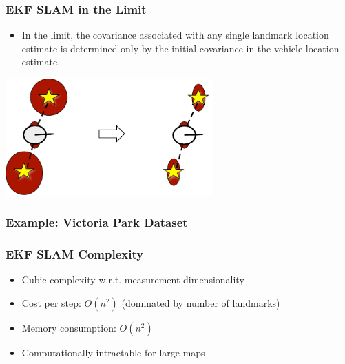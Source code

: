 \begin{frame}
    \frametitle{EKF SLAM in the Limit}
    
    \begin{itemize}
        \item In the limit, the covariance associated with any single landmark location estimate is determined only by the initial covariance in the vehicle location estimate.
    \end{itemize}

    \begin{center}
        \includegraphics[width=0.6\textwidth]{../images/ekf_slam/ekf_slam_limit.pdf}
    \end{center}

\end{frame}

\begin{frame}
    \frametitle{Example: Victoria Park Dataset}

\end{frame}

\begin{frame}
    \frametitle{EKF SLAM Complexity}

    \begin{itemize}
    \item Cubic complexity w.r.t. measurement dimensionality
    \item Cost per step: $O(n^2)$ (dominated by number of landmarks)
    \item Memory consumption: $O(n^2)$
    \item Computationally intractable for large maps
    \end{itemize}
\end{frame}

